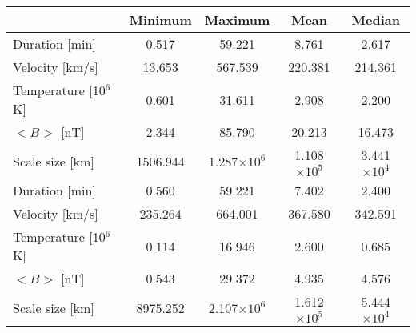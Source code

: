 \begin{tabular}{lcccc}
\hline
 & Minimum & Maximum & Mean & Median \\
\hline
Duration [min] & 0.517 & 59.221 & 8.761 & 2.617 \\

Velocity [km/s] & 13.653 & 567.539 & 220.381 & 214.361 \\

Temperature [10$^6$ K] & 0.601 & 31.611 & 2.908 & 2.200 \\

$<B>$ [nT] & 2.344 & 85.790 & 20.213 & 16.473 \\

Scale size [km] & 1506.944 & 1.287$\times 10^6$ & 1.108$\times 10^5$ & 3.441$\times 10^4$ \\

\hline \hline
Duration [min] & 0.560 & 59.221 & 7.402 & 2.400 \\

Velocity [km/s] & 235.264 & 664.001 & 367.580 & 342.591 \\

Temperature [10$^6$ K] & 0.114 & 16.946 & 2.600 & 0.685 \\

$<B>$ [nT] & 0.543 & 29.372 & 4.935 & 4.576 \\

Scale size [km] & 8975.252 & 2.107$\times 10^6$ & 1.612$\times 10^5$ & 5.444$\times 10^4$ \\

\hline
\end{tabular}
